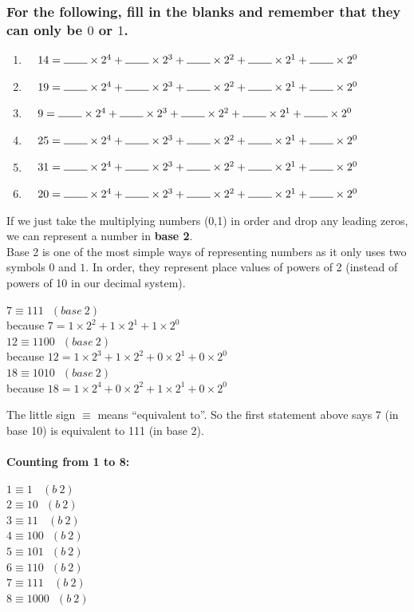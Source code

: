 \documentclass[a4paper,12pt]{article}
\newcommand\baseTwoSumSmall[1]{
$~~~#1=\rule{7.5mm}{0.15mm} \times 2^4 + \rule{7.5mm}{0.15mm} \times 2^3 + \rule{7.5mm}{0.15mm} \times 2^2+ \rule{7.5mm}{0.15mm} \times 2^1+ \rule{7.5mm}{0.15mm} \times 2^0$
}
\begin{document}
\subsubsection{For the following, fill in the blanks and remember that they can only be $0$ or $1$.}
\begin{enumerate}[label= \roman*)]
\item \baseTwoSumSmall{14}
\item \baseTwoSumSmall{19}
\item \baseTwoSumSmall{9}
\item \baseTwoSumSmall{25}
\item \baseTwoSumSmall{31}
\item \baseTwoSumSmall{20}
\end{enumerate}
If we just take the multiplying numbers (0,1) in order and drop any leading zeros, we can represent a number in \textbf{base 2}.\\
Base 2 is one of the most simple ways of representing numbers as it only uses two symbols $0$ and $1$.
In order, they represent place values of powers of 2 (instead of powers of 10 in our decimal system).
\begin{center}
$7 \equiv 111~~~(base~2)$\\
\tiny because $7= 1\times 2^2 + 1\times 2^1 + 1 \times 2^0$ \normalsize\\
$12 \equiv 1100~~~(base~2)$\\
\tiny because $12 = 1\times 2^3 + 1 \times 2^2 + 0\times 2^1 + 0\times 2^0$ \normalsize\\
$18 \equiv 1010~~~(base~2)$\\
\tiny because $18 = 1\times 2^4 + 0\times 2^2 + 1\times 2^1 + 0 \times 2^0$ \normalsize\\
\end{center}
The little sign $\equiv$ means ``equivalent to''. So the first statement above says 7 (in base 10) is equivalent to 111 (in base 2).\\\\
\textbf{Counting from 1 to 8:}
\begin{multicols}{4}
$1 \equiv 1~~~~(b~2)$\\
$2 \equiv 10~~~(b~2)$\\
$3 \equiv 11~~~~(b~2)$\\
$4 \equiv 100~~~(b~2)$\\
$5 \equiv 101~~~(b~2)$\\
$6 \equiv 110~~~(b~2)$\\
$7 \equiv 111~~~~(b~2)$\\
$8 \equiv 1000~~~(b~2)$
\end{multicols}
\end{document}
